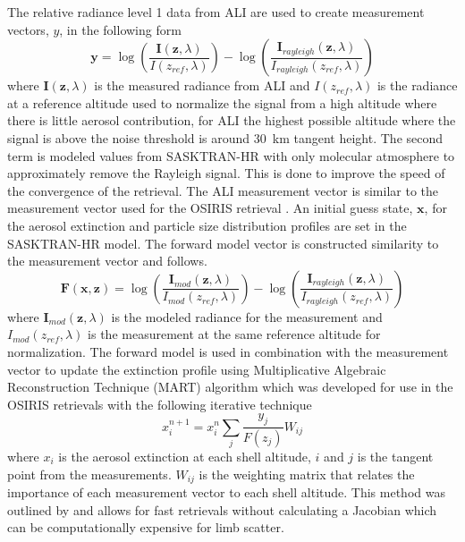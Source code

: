 \documentclass[12pt]{article}
\begin{document}
The relative radiance level 1 data from ALI are used to create measurement vectors, $y$, in the following form
\begin{equation}
    \mathbf{y} = \log\left(\frac{\mathbf{I}(\mathbf{z},\lambda)}{I(z_{ref},\lambda)}\right)-\log\left(\frac{\mathbf{I}_{rayleigh}(\mathbf{z},\lambda)}{I_{rayleigh}(z_{ref},\lambda)}\right)
    \label{eqn:measurementVector}
\end{equation}
where $\mathbf{I}(\mathbf{z},\lambda)$ is the measured radiance from ALI and $I(z_{ref},\lambda)$ is the radiance at a reference altitude used to normalize the signal from a high altitude where there is little aerosol contribution, for ALI the highest possible altitude where the signal is above the noise threshold is around 30~km tangent height. The second term is modeled values from SASKTRAN-HR with only molecular atmosphere to approximately remove the Rayleigh signal. This is done to improve the speed of the convergence of the retrieval. The ALI measurement vector is similar to the measurement vector used for the OSIRIS retrieval \citep{Bourassa2007,Bourassa2011}. An initial guess state, $\mathbf{x}$, for the aerosol extinction and particle size distribution profiles are set in the SASKTRAN-HR model. The forward model vector is constructed similarity to the measurement vector and follows.
\begin{equation}
    \mathbf{F}(\mathbf{x},\mathbf{z}) = \log\left(\frac{\mathbf{I}_{mod}(\mathbf{z},\lambda)}{I_{mod}(z_{ref},\lambda)}\right)-\log\left(\frac{\mathbf{I}_{rayleigh}(\mathbf{z},\lambda)}{I_{rayleigh}(z_{ref},\lambda)}\right)
    \label{eqn:forwardModel}
\end{equation}
where $\mathbf{I}_{mod}(\mathbf{z},\lambda)$ is the modeled radiance for the measurement and $I_{mod}(z_{ref},\lambda)$ is the measurement at the same reference altitude for normalization. The forward model is used in combination with the measurement vector to update the extinction profile using Multiplicative Algebraic Reconstruction Technique (MART) algorithm which was developed for use in the OSIRIS retrievals \citep{Bourassa2012a} with the following iterative technique
\begin{equation}
    x_{i}^{n+1} = x_{i}^{n}\sum_{j}\frac{y_{j}}{F(z_{j})}W_{ij}
\end{equation}
where $x_{i}$ is the aerosol extinction at each shell altitude, $i$ and $j$ is the tangent point from the measurements. $W_{ij}$ is the weighting matrix that relates the importance of each measurement vector to each shell altitude. This method was outlined by \cite{Degenstein2009} and allows for fast retrievals without calculating a Jacobian which can be computationally expensive for limb scatter.
\end{document}
